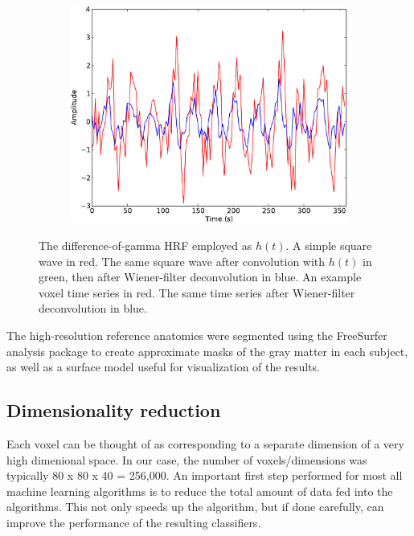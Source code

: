 \documentclass[preprint,5p,authoryear]{elsarticle}
\begin{document}
\begin{figure}
\begin{subfigure}{0.4\textwidth}
\includegraphics[width=\textwidth]{figures/voxel-wiener-deconvolution}
\caption{}
\label{fig:wiener-voxel}
\end{subfigure}
\caption{
 The difference-of-gamma HRF employed as $h(t)$. 
 A simple square wave in red. 
The same square wave after convolution with $h(t)$ in green, then after Wiener-filter deconvolution in blue. 
 An example voxel time series in red. 
The same time series after Wiener-filter deconvolution in blue.}
\label{fig:wiener-deconvolution}
\end{figure}

The high-resolution reference anatomies were segmented using the FreeSurfer analysis package \citep{FreeSurfer} to create approximate masks of the gray matter in each subject, as well as a surface model useful for visualization of the results.

\subsection{Dimensionality reduction}
Each voxel can be thought of as corresponding to a separate dimension of a very high dimenional space.
In our case, the number of voxels/dimensions was typically 80 x 80 x 40 = 256,000.
An important first step performed for most all machine learning algorithms is to reduce the total amount of data fed into the algorithms.
This not only speeds up the algorithm, but if done carefully, can improve the performance of the resulting classifiers.
\end{document}
